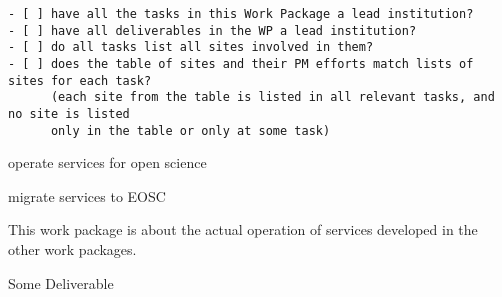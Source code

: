 \begin{draft}
\begin{verbatim}
- [ ] have all the tasks in this Work Package a lead institution?
- [ ] have all deliverables in the WP a lead institution?
- [ ] do all tasks list all sites involved in them?
- [ ] does the table of sites and their PM efforts match lists of sites for each task?
      (each site from the table is listed in all relevant tasks, and no site is listed
      only in the table or only at some task)
\end{verbatim}
\end{draft}

\begin{workpackage}[id=eosc,wphases=0-48,swsites,
  title=Services and EOSC Integration,
  short=EOSC,
  lead=SRL,
  EGIRM=20,
  SRLRM=18,
  UPSUDRM=4,
  WTTRM=6,
  EuXFELRM=6,
]
\begin{wpobjectives}
 \begin{compactitem}
   \item operate services for open science
   \item migrate services to EOSC
 \end{compactitem}
\end{wpobjectives}

\begin{wpdescription}

This work package is about the actual operation of services developed in the other work packages.


\end{wpdescription}

\begin{tasklist}
% 

\end{tasklist}




\begin{wpdelivs}
\begin{wpdeliv}[due=1,miles=startup,id=infrastructure,dissem=PU,nature=DEC,lead=SRL]
  {Some Deliverable}
\end{wpdeliv}

\end{wpdelivs}
\end{workpackage}

